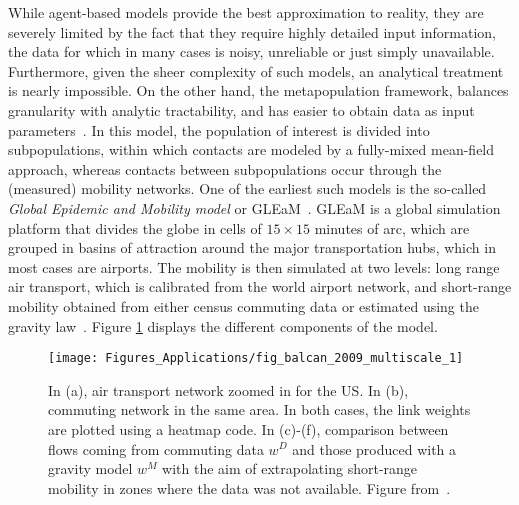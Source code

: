 While agent-based models provide the best approximation to reality, they are severely limited by the fact that they require highly detailed input information, the data for which in many cases is noisy, unreliable or just simply unavailable. Furthermore, given the sheer complexity of such models, an analytical treatment is nearly impossible. On the other hand, the metapopulation framework,  balances granularity with analytic tractability, and has easier to obtain data as input parameters~\cite{rvachev_1985_mathematical,sattenspiel_1995_structured,colizza_2007_invasion}. In this model, the population of interest is divided into subpopulations, within which contacts are modeled by a fully-mixed mean-field approach, whereas contacts between subpopulations occur through the (measured) mobility networks. One of the earliest such models is the so-called \emph{Global Epidemic and Mobility model} or GLEaM~\cite{balcan_2009_seasonal}. GLEaM is a global simulation platform that divides the globe in cells of $15\times15$ minutes of arc, which are grouped in basins of attraction around the major transportation hubs, which in most cases are airports. The  mobility is then simulated at two levels: long range air transport, which is calibrated from the world airport network, and short-range mobility obtained from either census commuting data or estimated using the gravity law~\cite{balcan_2010_modeling}. Figure \ref{fig:balcan_2009_multiscale_1} displays the different components of the model.

\begin{figure}[t!]
\centering
\texttt{[image: Figures\_Applications/fig\_balcan\_2009\_multiscale\_1]}
\caption{In (a), air transport network zoomed in for the US. In (b), commuting network in the same area. In both cases, the link weights are plotted using a heatmap code. In (c)-(f), comparison between flows coming from commuting data $w^D$ and those produced with a gravity model $w^M$ with the aim of extrapolating short-range mobility in zones where the data was not available. Figure from~\cite{balcan_2009_multiscale}. }
\label{fig:balcan_2009_multiscale_1}
\end{figure}

